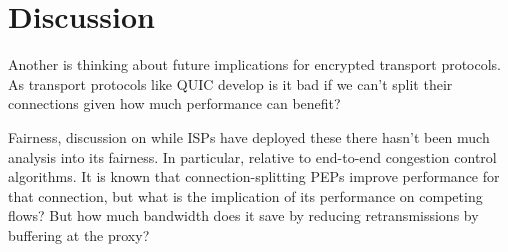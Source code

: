 \section{Discussion}
Another is thinking about future implications for encrypted transport protocols.
As transport protocols like QUIC develop is it bad if we can't split their
connections given how much performance can benefit?

Fairness, discussion on while ISPs have deployed these there hasn't been much
analysis into its fairness. In particular, relative to end-to-end congestion
control algorithms.
It is known that connection-splitting PEPs improve performance for that
connection, but what is the implication of its performance on competing flows?
But how much bandwidth does it save by reducing retransmissions by buffering at
the proxy?